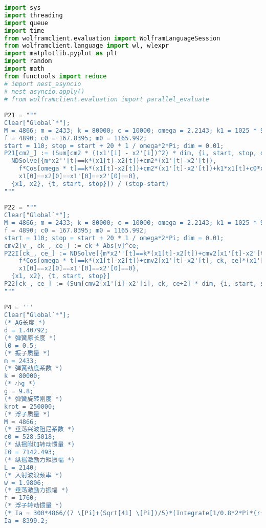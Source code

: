 \begin{lstlisting}[language=Python,breaklines=true]
import sys
import threading
import queue
import time
from wolframclient.evaluation import WolframLanguageSession
from wolframclient.language import wl, wlexpr
import matplotlib.pyplot as plt
import random
import math
from functools import reduce
# import nest_asyncio
# nest_asyncio.apply()
# from wolframclient.evaluation import parallel_evaluate

P21 = """
Clear["Global`*"];
M = 4866; m = 2433; k = 80000; c = 10000; omega = 2.2143; k1 = 1025 * 9.8 * Pi;
f = 4890; c0 = 167.8395; m0 = 1165.992;
start = 110; stop = start + 20 * 1 / omega*2*Pi; dim = 0.01;
P21[cm2_] := (Sum[cm2 * ((x1'[i] - x2'[i])^2) * dim, {i, start, stop, dim}] /. 
  NDSolve[{m*x2''[t]==k*(x1[t]-x2[t])+cm2*(x1'[t]-x2'[t]), 
    f*Cos[omega * t]==k*(x1[t]-x2[t])+cm2*(x1'[t]-x2'[t])+k1*x1[t]+c0*x1'[t]+m0*x1''[t]+M*x1''[t], 
    x1[0]==x2[0]==x1'[0]==x2'[0]==0},
  {x1, x2}, {t, start, stop}]) / (stop-start)
"""

P22 = """
Clear["Global`*"];
M = 4866; m = 2433; k = 80000; c = 10000; omega = 2.2143; k1 = 1025 * 9.8 * Pi;
f = 4890; c0 = 167.8395; m0 = 1165.992;
start = 110; stop = start + 20 * 1 / omega*2*Pi; dim = 0.01;
cmv2[v_, ck_, ce_] := ck * Abs[v]^ce;
P22I[ck_, ce_] := NDSolve[{m*x2''[t]==k*(x1[t]-x2[t])+cmv2[x1'[t]-x2'[t], ck, ce]*(x1'[t]-x2'[t]), 
    f*Cos[omega * t]==k*(x1[t]-x2[t])+cmv2[x1'[t]-x2'[t], ck, ce]*(x1'[t]-x2'[t])+k1*x1[t]+c0*x1'[t]+m0*x1''[t]+M*x1''[t], 
    x1[0]==x2[0]==x1'[0]==x2'[0]==0},
  {x1, x2}, {t, start, stop}]
P22[ck_, ce_] := (Sum[cmv2[x1'[i]-x2'[i], ck, ce+2] * dim, {i, start, stop, dim}] /. P22I[ck, ce]) / (stop-start)
"""

P4 = '''
Clear["Global`*"];
(* AG长度 *)
d = 1.40792;
(* 弹簧原长度 *)
l0 = 0.5; 
(* 振子质量 *)
m = 2433; 
(* 弹簧劲度系数 *)
k = 80000;
(* 小g *)
g = 9.8;
(* 弹簧旋转刚度 *)
krot = 250000;
(* 浮子质量 *)
M = 4866;
(* 垂荡兴波阻尼系数 *)
c0 = 528.5018;
(* 纵摇附加转动惯量 *)
I0 = 7142.493;
(* 纵摇激励力矩振幅 *)
L = 2140;
(* 入射波浪频率 *)
w = 1.9806;
(* 垂荡激励力振幅 *)
f = 1760;
(* 浮子转动惯量 *)
(* Ia = 300*4866/(7 \[Pi]+(Sqrt[41] \[Pi])/5)*(Integrate[1/0.8*2*Pi*(r+(17.6+8/75*(Sqrt[41]))/(7+(Sqrt[41])/5))*r^2,{r,-(17.6+8/75*(Sqrt[41]))/(7+(Sqrt[41])/5),-(17.6+8/75*(Sqrt[41]))/(7+(Sqrt[41])/5)+0.8}]+Integrate[2*Pi*r^2,{r,-(17.6+8/75*(Sqrt[41]))/(7+(Sqrt[41])/5)+0.8,-(17.6+8/75*(Sqrt[41]))/(7+(Sqrt[41])/5)+3.8}]+Integrate[2*Pi*(3.8-(17.6+8/75*(Sqrt[41]))/(7+(Sqrt[41])/5))^2+a^2,{a,0,0.5}]); *)
Ia = 8399.2;


\end{lstlisting}
